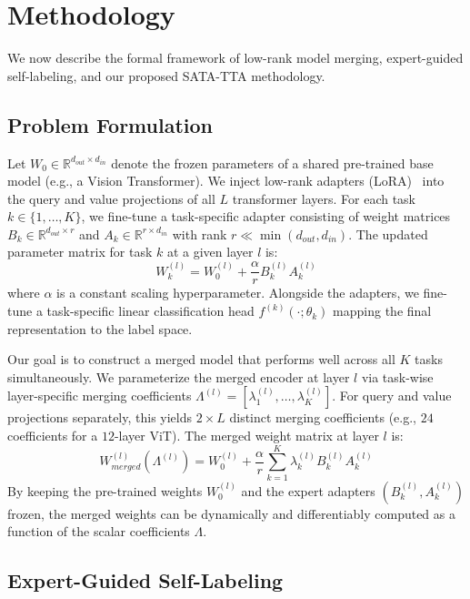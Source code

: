 \documentclass{article}
\theoremstyle{plain}
\theoremstyle{definition}
\theoremstyle{remark}
\begin{document}
\section{Methodology}
\label{submission-methodology}

We now describe the formal framework of low-rank model merging, expert-guided self-labeling, and our proposed SATA-TTA methodology.

\subsection{Problem Formulation}

Let $W_0 \in \mathbb{R}^{d_{out} \times d_{in}}$ denote the frozen parameters of a shared pre-trained base model (e.g., a Vision Transformer). We inject low-rank adapters (LoRA)~\cite{hu2021lora} into the query and value projections of all $L$ transformer layers. For each task $k \in \{1, \dots, K\}$, we fine-tune a task-specific adapter consisting of weight matrices $B_k \in \mathbb{R}^{d_{out} \times r}$ and $A_k \in \mathbb{R}^{r \times d_{in}}$ with rank $r \ll \min(d_{out}, d_{in})$. The updated parameter matrix for task $k$ at a given layer $l$ is:
\begin{equation}
  W_k^{(l)} = W_0^{(l)} + \frac{\alpha}{r} B_k^{(l)} A_k^{(l)}
\end{equation}
where $\alpha$ is a constant scaling hyperparameter. Alongside the adapters, we fine-tune a task-specific linear classification head $f^{(k)}(\cdot; \theta_k)$ mapping the final representation to the label space.

Our goal is to construct a merged model that performs well across all $K$ tasks simultaneously. We parameterize the merged encoder at layer $l$ via task-wise layer-specific merging coefficients $\Lambda^{(l)} = [\lambda_1^{(l)}, \dots, \lambda_K^{(l)}]$. For query and value projections separately, this yields $2 \times L$ distinct merging coefficients (e.g., $24$ coefficients for a $12$-layer ViT). The merged weight matrix at layer $l$ is:
\begin{equation}
  W_{merged}^{(l)}(\Lambda^{(l)}) = W_0^{(l)} + \frac{\alpha}{r} \sum_{k=1}^K \lambda_k^{(l)} B_k^{(l)} A_k^{(l)}
\end{equation}
By keeping the pre-trained weights $W_0^{(l)}$ and the expert adapters $(B_k^{(l)}, A_k^{(l)})$ frozen, the merged weights can be dynamically and differentiably computed as a function of the scalar coefficients $\Lambda$.

\subsection{Expert-Guided Self-Labeling}
\end{document}
